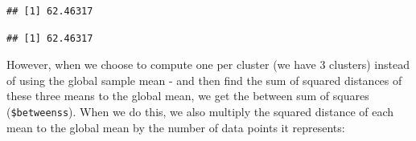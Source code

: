 \documentclass[]{article}
\newenvironment{Shaded}{\begin{snugshade}}{\end{snugshade}}
\newcommand{\DecValTok}[1]{\textcolor[rgb]{0.00,0.00,0.81}{#1}}
\newcommand{\KeywordTok}[1]{\textcolor[rgb]{0.13,0.29,0.53}{\textbf{#1}}}
\newcommand{\NormalTok}[1]{#1}
\newcommand{\OperatorTok}[1]{\textcolor[rgb]{0.81,0.36,0.00}{\textbf{#1}}}
\newcommand{\StringTok}[1]{\textcolor[rgb]{0.31,0.60,0.02}{#1}}
\begin{document}
\begin{verbatim}
## [1] 62.46317
\end{verbatim}

\begin{Shaded}
\end{Shaded}

\begin{verbatim}
## [1] 62.46317
\end{verbatim}

However, when we choose to compute one per cluster (we have 3 clusters)
instead of using the global sample mean - and then find the sum of
squared distances of these three means to the global mean, we get the
between sum of squares (\texttt{\$betweenss}). When we do this, we also
multiply the squared distance of each mean to the global mean by the
number of data points it represents:

\begin{Shaded}
\end{Shaded}
\end{document}
